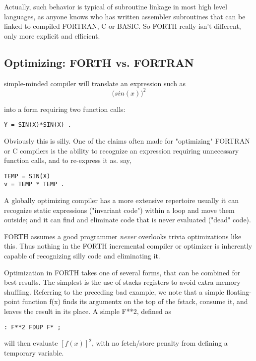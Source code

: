 Actually, such behavior is typical of subroutine linkage in most high
level languages, as anyone knows who has written assembler subroutines that can
be linked to compiled FORTRAN, C or BASIC.
So FORTH really isn't different, only more explicit and efficient.

\subsection{Optimizing: FORTH vs. FORTRAN}
 simple-minded compiler will translate an expression such as
\begin{equation}
     \Big( sin(x) \Big)^2
\end{equation}

into a form requiring two function calls:

\begin{verbatim}
Y = SIN(X)*SIN(X) .
\end{verbatim}

Obviously this is silly. One of the claims often made for "optimizing" FORTRAN
or C compilers is the ability to recognize an
expression requiring unnecessary function calls, and to re-express
it as. say,
  
\begin{verbatim}
TEMP = SIN(X)
v = TEMP * TEMP .
\end{verbatim}

A globally optimizing compiler has a more extensive repertoire
usually it can recognize static expressions ("invariant code")
within a loop and move them outside; and it can find and eliminate code that is
never evaluated ("dead" code).

FORTH assumes a good programmer \textit{never} overlooks trivia
optimizations like this. Thus nothing in the FORTH incremental
compiler or optimizer is inherently capable of recognizing silly
code and eliminating it.

Optimization in FORTH takes one of several forms, that can be
combined for best results. The simplest is the use of stacks
registers to avoid extra memory shuffling. Referring to the
preceding bad example, we note that a simple floating-point
function f(x) finds its argumentx on the top of the fstack, consume
it, and leaves the result in its place. A simple F**2, defined as

\begin{verbatim}
: F**2 FDUP F* ;
\end{verbatim}

will then evaluate $[f(x)]^2$, with no fetch/store penalty from defining
a temporary variable.

